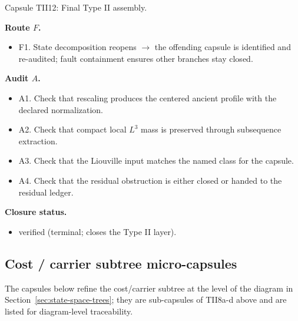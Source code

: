 \documentclass[11pt]{amsart}
\newcommand{\capsulefield}[1]{\par\smallskip\noindent\textbf{#1.}\ }
\begin{document}
\begin{proofcapsule}{Capsule TII12: Final Type II assembly.}
  \capsulefield{Route \(F\)}
  \begin{itemize}[leftmargin=1.8em]
  \item F1. State decomposition reopens $\to$ the offending capsule is identified and re-audited; fault containment ensures other branches stay closed.
  \end{itemize}

  \capsulefield{Audit \(A\)}
  \begin{itemize}[leftmargin=1.8em]
  \item A1. Check that rescaling produces the centered ancient profile with the declared normalization.
  \item A2. Check that compact local $L^3$ mass is preserved through subsequence extraction.
  \item A3. Check that the Liouville input matches the named class for the capsule.
  \item A4. Check that the residual obstruction is either closed or handed to the residual ledger.
  \end{itemize}
  \capsulefield{Closure status}
  \begin{itemize}[leftmargin=1.8em]
  \item verified (terminal; closes the Type II layer).
  \end{itemize}
\end{proofcapsule}

\subsection{Cost / carrier subtree micro-capsules}

The capsules below refine the cost/carrier subtree at the level of the
diagram in Section~\ref{sec:state-space-trees}; they are sub-capsules of TII8a-d
above and are listed for diagram-level traceability.
\end{document}
